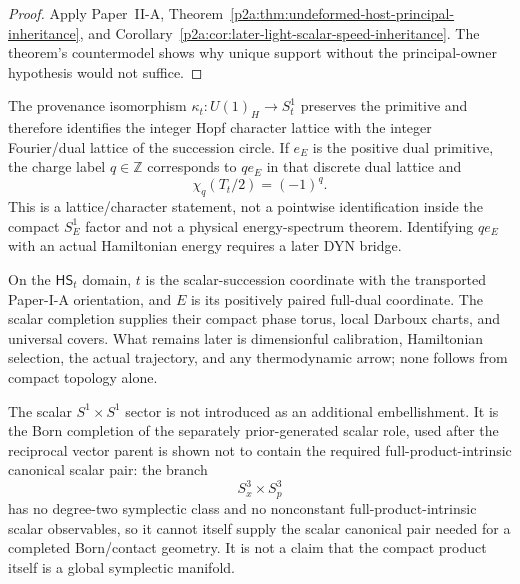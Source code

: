 \documentclass[12pt,a4paper]{article}
\begin{document}
\begin{proof}
Apply Paper~II-A,
Theorem~\ref{p2a:thm:undeformed-host-principal-inheritance}, and
Corollary~\ref{p2a:cor:later-light-scalar-speed-inheritance}.  The theorem's
countermodel shows why unique support without the principal-owner hypothesis
would not suffice.
\end{proof}

\begin{remark}
\label{p3a:rem:hopf-character-energy-lattice}
The provenance isomorphism \(\kappa_t:U(1)_H\to S_t^1\) preserves the
primitive and therefore identifies the integer Hopf character lattice with
the integer Fourier/dual lattice of the succession circle.  If \(e_E\) is the
positive dual primitive, the charge label \(q\in\mathbb Z\) corresponds to
\(q e_E\) in that discrete dual lattice and
\[
 \chi_q(T_t/2)=(-1)^q.
\]
This is a lattice/character statement, not a pointwise identification inside
the compact \(S_E^1\) factor and not a physical energy-spectrum theorem.
Identifying \(q e_E\) with an actual Hamiltonian energy requires a later DYN
bridge.
\end{remark}

\begin{remark}
\label{p3:rem:time-energy-upgrade}
On the \(\mathsf{HS}_t\) domain, \(t\) is the scalar-succession coordinate
with the transported Paper-I-A orientation, and \(E\) is its positively paired
full-dual coordinate.  The scalar completion supplies their compact phase
torus, local Darboux charts, and universal covers.  What remains later is
dimensionful calibration, Hamiltonian selection, the actual trajectory, and
any thermodynamic arrow; none follows from compact topology alone.
\end{remark}

\begin{remark}
\label{p3:rem:scalar-closure}
The scalar $S^1\times S^1$ sector is not introduced as an additional embellishment. It is the Born completion of the separately prior-generated scalar role, used after the reciprocal vector parent is shown not to contain the required full-product-intrinsic canonical scalar pair: the branch
\[
S^3_x\times S^3_p
\]
has no degree-two symplectic class and no nonconstant full-product-intrinsic scalar observables, so it cannot itself supply the scalar canonical pair needed for a completed Born/contact geometry.  It is not a claim that the compact product itself is a global symplectic manifold.
\end{remark}
\end{document}
